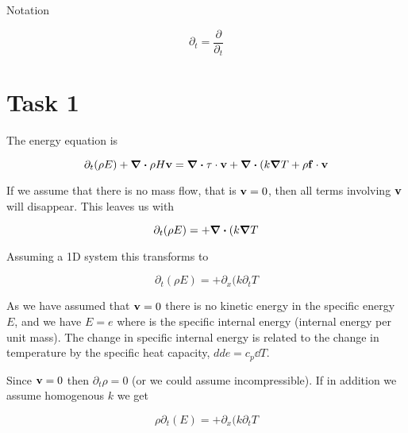 \documentclass{article}
\begin{document}
Notation

\begin{equation}
	\partial_t = \frac{\partial}{\partial_t}
\end{equation}

\section{Task 1}

The energy equation is

\begin{equation}
	\partial_t (\rho E) + \div{\rho H \mathbf{v}} = \div{\tau \cdot \mathbf{v}} + \div{(k\grad{T}}+ \rho \mathbf{f} \cdot \mathbf{v}
\end{equation}

If we assume that there is no mass flow, that is $\mathbf{v} = 0$, then all terms involving $\mathbf{v}$ will disappear. This leaves us with

\begin{equation}
	\partial_t (\rho E) = + \div{(k\grad{T}}
\end{equation}

Assuming a 1D system this transforms to

\begin{equation}
	\partial_t (\rho E) = + \partial_x{(k\partial_t{T}}
\end{equation}

As we have assumed that $\mathbf{v}=0$ there is no kinetic energy in the specific energy $E$, and we have $E = e$ where is the specific internal energy (internal energy per unit mass). The change in specific internal energy is related to the change in temperature by the specific heat capacity, $dd{e} = c_p \dd{T}$.

Since $\mathbf{v} = 0$ then $\partial_t \rho = 0$ (or we could assume incompressible). If in addition we assume homogenous $k$ we get

\begin{equation}
	\rho\partial_t (E) = + \partial_x{(k\partial_t{T}}
\end{equation}
\end{document}
